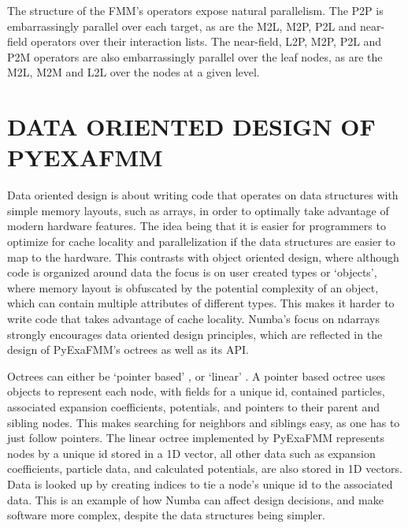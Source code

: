 \documentclass{IEEEcsmag}
\begin{document}
The structure of the FMM's operators expose natural parallelism. The P2P is embarrassingly parallel over each target, as are the M2L, M2P, P2L and near-field operators over their interaction lists. The near-field, L2P, M2P, P2L and P2M operators are also embarrassingly parallel over the leaf nodes, as are the M2L, M2M and L2L over the nodes at a given level.

\section{DATA ORIENTED DESIGN OF PYEXAFMM}

Data oriented design is about writing code that operates on data structures with simple memory layouts, such as arrays, in order to optimally take advantage of modern hardware features. The idea being that it is easier for programmers to optimize for cache locality and parallelization if the data structures are easier to map to the hardware. This contrasts with object oriented design, where although code is organized around data the focus is on user created types or `objects', where memory layout is obfuscated by the potential complexity of an object, which can contain multiple attributes of different types. This makes it harder to write code that takes advantage of cache locality. Numba's focus on ndarrays strongly encourages data oriented design principles, which are reflected in the design of PyExaFMM's octrees as well as its API.

Octrees can either be `pointer based' \cite{Wang2021}, or `linear' \cite{Sundar2007}. A pointer based octree uses objects to represent each node, with fields for a unique id, contained particles, associated expansion coefficients, potentials, and pointers to their parent and sibling nodes. This makes searching for neighbors and siblings easy, as one has to just follow pointers. The linear octree implemented by PyExaFMM represents nodes by a unique id stored in a 1D vector, all other data such as expansion coefficients, particle data, and calculated potentials, are also stored in 1D vectors. Data is looked up by creating indices to tie a node's unique id to the associated data. This is an example of how Numba can affect design decisions, and make software more complex, despite the data structures being simpler.
\end{document}
